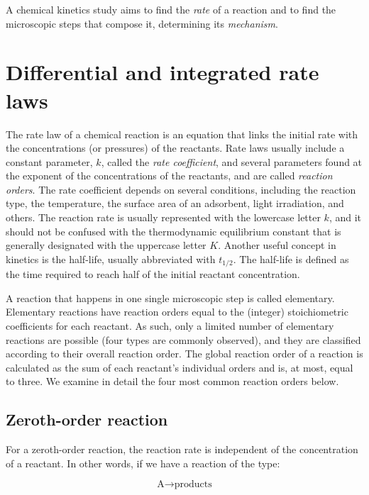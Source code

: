 \documentclass[
  9pt,
]{extbook}
\theoremstyle{definition}
\theoremstyle{definition}
\theoremstyle{definition}
\theoremstyle{definition}
\theoremstyle{remark}
\begin{document}
A chemical kinetics study aims to find the \emph{rate} of a reaction and to find the microscopic steps that compose it, determining its \emph{mechanism}.

\section{Differential and integrated rate laws}\label{diffintk}

The rate law of a chemical reaction is an equation that links the initial rate with the concentrations (or pressures) of the reactants. Rate laws usually include a constant parameter, \(k\), called the \emph{rate coefficient}, and several parameters found at the exponent of the concentrations of the reactants, and are called \emph{reaction orders}. The rate coefficient depends on several conditions, including the reaction type, the temperature, the surface area of an adsorbent, light irradiation, and others. The reaction rate is usually represented with the lowercase letter \(k\), and it should not be confused with the thermodynamic equilibrium constant that is generally designated with the uppercase letter \(K\). Another useful concept in kinetics is the half-life, usually abbreviated with \(t_{1/2}\). The half-life is defined as the time required to reach half of the initial reactant concentration.

A reaction that happens in one single microscopic step is called elementary. Elementary reactions have reaction orders equal to the (integer) stoichiometric coefficients for each reactant. As such, only a limited number of elementary reactions are possible (four types are commonly observed), and they are classified according to their overall reaction order. The global reaction order of a reaction is calculated as the sum of each reactant's individual orders and is, at most, equal to three. We examine in detail the four most common reaction orders below.

\subsection{Zeroth-order reaction}\label{zeroth-order-reaction}

For a zeroth-order reaction, the reaction rate is independent of the concentration of a reactant. In other words, if we have a reaction of the type:

\begin{equation}
\text{A}\longrightarrow\text{products}
\end{equation}
\end{document}
